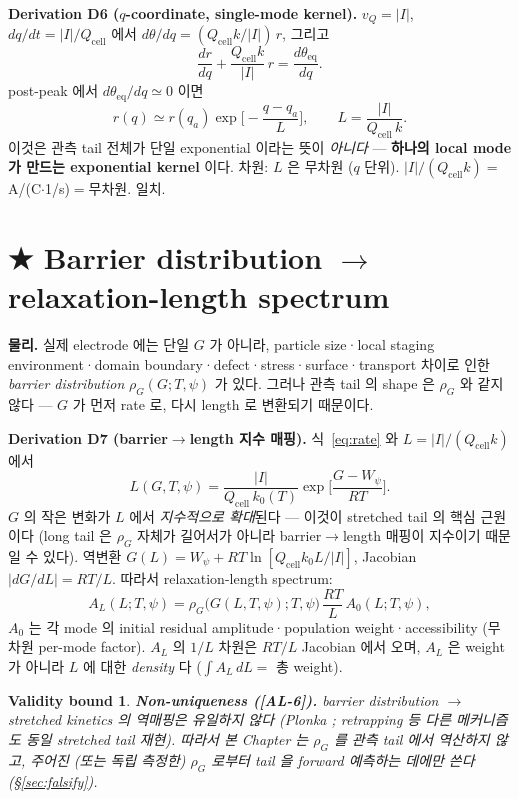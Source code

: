 \documentclass[11pt,a4paper]{article}
\newtheorem*{boundbox}{Validity bound}
\newcommand{\eq}{\mathrm{eq}}
\newcommand{\cell}{\mathrm{cell}}
\newcommand{\AL}[1]{\textsf{[AL-#1]}}
\begin{document}
\textbf{Derivation D6 ($q$-coordinate, single-mode kernel).} $v_Q=|I|$, $dq/dt=|I|/Q_\cell$
에서 $d\theta/dq=(Q_\cell k/|I|)\,r$, 그리고
\begin{equation}
\frac{dr}{dq}+\frac{Q_\cell k}{|I|}\,r=\frac{d\theta_\eq}{dq}.
\label{eq:r_ode}
\end{equation}
post-peak 에서 $d\theta_\eq/dq\simeq0$ 이면
\begin{equation}
\boxed{\;r(q)\simeq r(q_a)\exp\!\Big[-\frac{q-q_a}{L}\Big],\qquad L=\frac{|I|}{Q_\cell\,k}.\;}
\label{eq:single_kernel}
\end{equation}
이것은 관측 tail 전체가 단일 exponential 이라는 뜻이 \emph{아니다} — \textbf{하나의 local
mode 가 만드는 exponential kernel} 이다. 차원: $L$ 은 무차원 ($q$ 단위). $|I|/(Q_\cell k)=$
A/(C$\cdot$1/s)$=$무차원. 일치.

\section{★ Barrier distribution $\to$ relaxation-length spectrum}\label{sec:spectrum}
\textbf{물리.} 실제 electrode 에는 단일 $G$ 가 아니라, particle size·local staging
environment·domain boundary·defect·stress·surface·transport 차이로 인한 \emph{barrier
distribution} $\rho_G(G;T,\psi)$ 가 있다. 그러나 관측 tail 의 shape 은 $\rho_G$ 와 같지
않다 — $G$ 가 먼저 rate 로, 다시 length 로 변환되기 때문이다.

\textbf{Derivation D7 (barrier$\to$length 지수 매핑).} 식~\eqref{eq:rate} 와 $L=|I|/(Q_\cell k)$
에서
\begin{equation}
\boxed{\;L(G,T,\psi)=\frac{|I|}{Q_\cell\,k_0(T)}\exp\!\Big[\frac{G-W_\psi}{RT}\Big].\;}
\label{eq:L_of_G}
\end{equation}
$G$ 의 작은 변화가 $L$ 에서 \emph{지수적으로 확대}된다 — 이것이 stretched tail 의 핵심
근원이다 (long tail 은 $\rho_G$ 자체가 길어서가 아니라 barrier$\to$length 매핑이 지수이기
때문일 수 있다). 역변환 $G(L)=W_\psi+RT\ln[Q_\cell k_0 L/|I|]$, Jacobian $|dG/dL|=RT/L$.
따라서 relaxation-length spectrum:
\begin{equation}
A_L(L;T,\psi)=\rho_G\big(G(L,T,\psi);T,\psi\big)\,\frac{RT}{L}\,A_0(L;T,\psi),
\label{eq:spectrum}
\end{equation}
$A_0$ 는 각 mode 의 initial residual amplitude·population weight·accessibility (무차원
per-mode factor). $A_L$ 의 $1/L$ 차원은 $RT/L$ Jacobian 에서 오며, $A_L$ 은 weight 가
아니라 $L$ 에 대한 \emph{density} 다 ($\int A_L\,dL=$ 총 weight).
\begin{boundbox}
\textbf{Non-uniqueness (\AL{6}).} barrier distribution $\to$ stretched kinetics 의 역매핑은
\emph{유일하지 않다} (Plonka \cite{plonka2001}; retrapping 등 다른 메커니즘도 동일 stretched
tail 재현). 따라서 본 Chapter 는 $\rho_G$ 를 관측 tail 에서 \emph{역산하지 않고},
주어진 (또는 독립 측정한) $\rho_G$ 로부터 tail 을 \emph{forward 예측}하는 데에만 쓴다
(\S\ref{sec:falsify}).
\end{boundbox}
\end{document}
